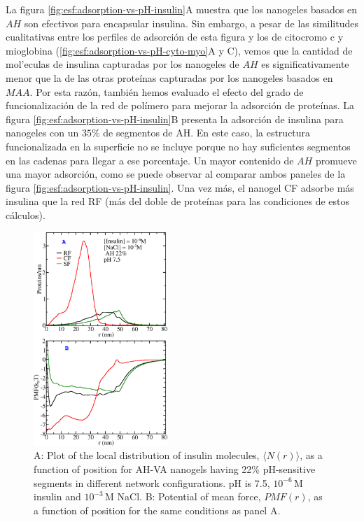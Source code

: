 La figura \ref{fig:esf:adsorption-vs-pH-insulin}A muestra que los nanogeles basados en $AH$ son efectivos para encapsular insulina.
Sin embargo, a pesar de las similitudes cualitativas entre los perfiles de adsorci\'on de esta figura y los de citocromo c y mioglobina (\ref{fig:esf:adsorption-vs-pH-cyto-myo}A y C), vemos que la cantidad de mol'eculas de insulina capturadas por los nanogeles de $AH$ es significativamente menor que la de las otras prote\'inas capturadas por los nanogeles basados en $MAA$.
Por esta raz\'on, tambi\'en hemos evaluado el efecto del grado de funcionalizaci\'on de la red de pol\'imero para mejorar la adsorci\'on de prote\'inas.
La figura \ref{fig:esf:adsorption-vs-pH-insulin}B presenta la adsorci\'on de insulina para nanogeles con un $35\%$ de segmentos de AH.
En este caso, la estructura funcionalizada en la superficie no se incluye porque no hay suficientes segmentos en las cadenas para llegar a ese porcentaje.
Un mayor contenido de $AH$ promueve una mayor adsorci\'on, como se puede observar al comparar ambos paneles de la figura \ref{fig:esf:adsorption-vs-pH-insulin}.
Una vez m\'as, el nanogel CF adsorbe m\'as insulina que la red RF (m\'as del doble de prote\'inas para las condiciones de estos c\'alculos).




\begin{figure}[!htb]
    \centering
    \includegraphics[width=0.45\textwidth]{Figures/graphs-gel2/insu-ads-pmf.png}
    \caption{A: Plot of the local distribution of insulin molecules, $\langle N(r)\rangle$, as a function of position for AH-VA nanogels having 22\% pH-sensitive segments in different network configurations.
    pH is 7.5, $10^{-6}$\,M insulin and  $10^{-3}$\,M NaCl.
    B: Potential of mean force,  ${PMF}(r)$, as a function of position for the same conditions as panel A.}
    \label{fig:esf:adsorption-vs-r-insulin}
\end{figure}



